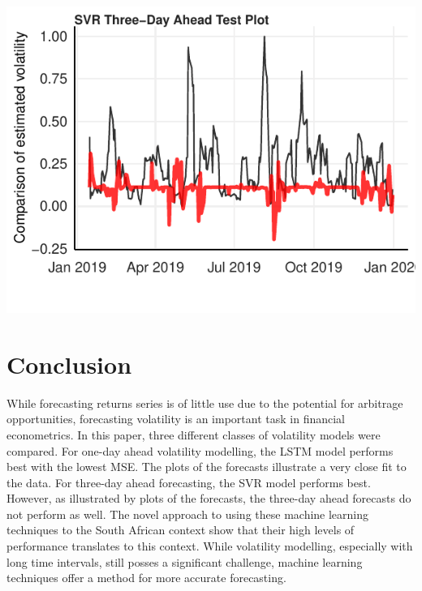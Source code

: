 \documentclass[11pt,preprint, authoryear]{elsarticle}
\let\origfigure\figure
\let\endorigfigure\endfigure
\renewenvironment{figure}[1][2] {
    \expandafter\origfigure\expandafter[H]
} {
    \endorigfigure
}
\numberwithin{equation}{section}
\numberwithin{figure}{section}
\numberwithin{table}{section}
\begin{document}
\begin{figure}[H]

{\centering \includegraphics{Essay_files/figure-latex/plot_3_test-1} 

}

\caption{LSTM Three-Day Ahead Test Forecast \label{svr_test_three}}\label{fig:plot_3_test}
\end{figure}

\hypertarget{conclusion}{%
\section{Conclusion}\label{conclusion}}

While forecasting returns series is of little use due to the potential
for arbitrage opportunities, forecasting volatility is an important task
in financial econometrics. In this paper, three different classes of
volatility models were compared. For one-day ahead volatility modelling,
the LSTM model performs best with the lowest MSE. The plots of the
forecasts illustrate a very close fit to the data. For three-day ahead
forecasting, the SVR model performs best. However, as illustrated by
plots of the forecasts, the three-day ahead forecasts do not perform as
well. The novel approach to using these machine learning techniques to
the South African context show that their high levels of performance
translates to this context. While volatility modelling, especially with
long time intervals, still posses a significant challenge, machine
learning techniques offer a method for more accurate forecasting.

\newpage
\end{document}
